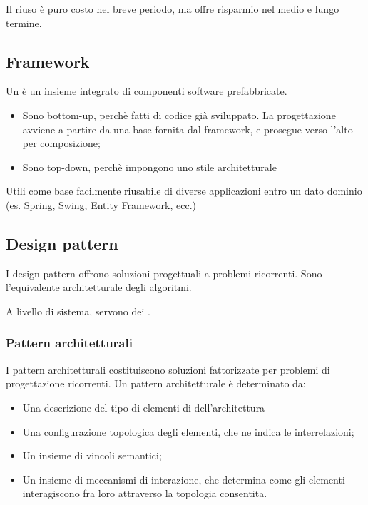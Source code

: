 \begin{itemize}
Il riuso è puro costo nel breve periodo, ma offre risparmio nel medio e lungo
termine.

\subsection{Framework}

Un  è un insieme integrato di componenti software
prefabbricate.

\begin{itemize}
  \item Sono bottom-up, perchè fatti di codice già sviluppato. La progettazione
        avviene a partire da una base fornita dal framework, e prosegue verso
        l'alto per composizione;
  \item Sono top-down, perchè impongono uno stile architetturale
\end{itemize}

Utili come base facilmente riusabile di diverse applicazioni entro un dato
dominio (es. Spring, Swing, Entity Framework, ecc.)

\subsection{Design pattern}

I design pattern offrono soluzioni progettuali a problemi ricorrenti. Sono
l'equivalente architetturale degli algoritmi.

A livello di sistema, servono dei .

\subsubsection{Pattern architetturali}

I pattern architetturali costituiscono soluzioni fattorizzate per problemi di
progettazione ricorrenti. Un pattern architetturale è determinato da:

\begin{itemize}
  \item Una descrizione del tipo di elementi di dell'architettura
  \item Una configurazione topologica degli elementi, che ne indica le
    interrelazioni;
  \item Un insieme di vincoli semantici;
  \item Un insieme di meccanismi di interazione, che determina come gli elementi
    interagiscono fra loro attraverso la topologia consentita.


\end{itemize}
\end{itemize}
